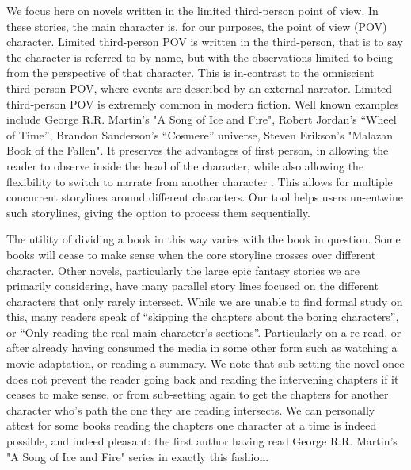 \documentclass[11pt,a4paper]{article}
\newcommand{\parencite}{\citep}
\begin{document}
We focus here on novels written in the limited third-person point of view.
In these stories, the main character is, for our purposes, the point of view (POV) character.
Limited third-person POV is written in the third-person, that is to say the character is referred to by name, but with the observations limited to being from the perspective of that character.
This is in-contrast to the omniscient third-person POV, where events are described by an external narrator.
Limited third-person POV is extremely common in modern fiction.
Well known examples include George R.R. Martin's "A Song of Ice and Fire", 
Robert Jordan's ``Wheel of Time'', Brandon Sanderson's ``Cosmere'' universe, 
Steven Erikson's "Malazan Book of the Fallen".
It preserves the advantages of first person, in allowing the reader to observe inside the head of the character, while also allowing the flexibility to switch to narrate from another character \parencite{booth2010rhetoric}.
This allows for multiple concurrent storylines around different characters.
Our tool helps users un-entwine such storylines, giving the option to process them sequentially.







The utility of dividing a book in this way varies with the book in question.
Some books will cease to make sense when the core storyline crosses over different character.
Other novels, particularly the large epic fantasy stories we are primarily considering,
have many parallel story lines focused on the different characters that only rarely intersect.
While we are unable to find formal study on this, 
many readers speak of ``skipping the chapters about the boring characters'',
or ``Only reading the real main character's sections''.
Particularly on a re-read, or after already having consumed the media in some other form such as watching a movie adaptation, or reading a summary.
We note that sub-setting the novel once does not prevent the reader going back and reading the intervening chapters if it ceases to make sense, or from sub-setting again to get the chapters for another character who's path the one they are reading intersects.
We can personally attest for some books reading the chapters one character at a time is indeed possible, and indeed pleasant: the first author having read George R.R. Martin's "A Song of Ice and Fire" series in exactly this fashion.
\end{document}
